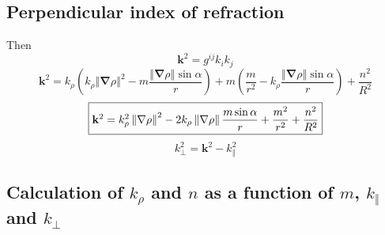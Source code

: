 \documentclass[a4paper,12pt]{article}%
\begin{document}
\subsection{Perpendicular index of refraction}

Then
\begin{equation}
\mathbf{k}^{2}=g^{ij}k_{i}k_{j}%
\end{equation}%
\begin{equation}
\mathbf{k}^{2}=k_{\rho}\left(  k_{\rho}\left\Vert \mathbf{\nabla}%
\rho\right\Vert ^{2}-m\dfrac{\left\Vert \mathbf{\nabla}\rho\right\Vert
\sin\alpha}{r}\right)  +m\left(  \dfrac{m}{r^{2}}-k_{\rho}\dfrac{\left\Vert
\mathbf{\nabla}\rho\right\Vert \sin\alpha}{r}\right)  +\dfrac{n^{2}}{R^{2}}%
\end{equation}%
\begin{equation}
\fbox{$\mathbf{k}^{2}=k_{\rho}^{2}\left\Vert \mathbf{\nabla}\rho\right\Vert
^{2}-2k_{\rho}\left\Vert \mathbf{\nabla}\rho\right\Vert \dfrac{m\sin\alpha}%
{r}+\dfrac{m^{2}}{r^{2}}+\dfrac{n^{2}}{R^{2}}$}%
\end{equation}%
\begin{equation}
k_{\bot}^{2}=\mathbf{k}^{2}-k_{\Vert}^{2}%
\end{equation}


\subsection{Calculation of $k_{\rho}$ and $n$ as a function of $m$, $k_{\Vert
}$ and $k_{\bot}$}
\end{document}
